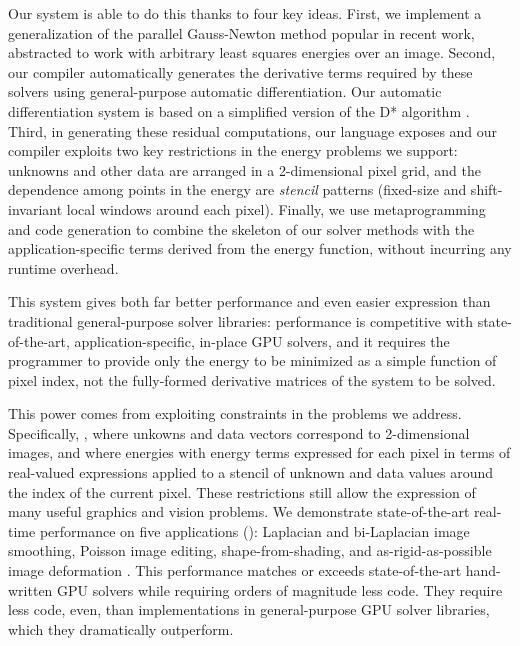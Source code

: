 Our system is able to do this thanks to four key ideas.
First, we implement a generalization of the parallel Gauss-Newton method popular in recent work, abstracted to work with arbitrary least squares energies over an image.
Second, our compiler automatically generates the derivative terms required by these solvers using general-purpose automatic  differentiation.
Our automatic differentiation system is based on a simplified version of the D* algorithm \cite{dstar}.
Third, in generating these residual computations, our language exposes and our compiler exploits two key restrictions in the energy problems we support: unknowns and other data are arranged in a 2-dimensional pixel grid, and the dependence among points in the energy are \emph{stencil} patterns (fixed-size and shift-invariant local windows around each pixel).
Finally, we use metaprogramming and code generation to combine the skeleton of our solver methods with the application-specific terms derived from the energy function, without incurring any runtime overhead.

This system gives both far better performance and even easier expression than traditional general-purpose solver libraries: performance is competitive with state-of-the-art, application-specific, in-place GPU solvers, and it requires the programmer to provide only the energy to be minimized as a simple function of pixel index, not the fully-formed derivative matrices of the system to be solved.

This power comes from exploiting constraints in the problems we address.
Specifically, , where unkowns and data vectors correspond to 2-dimensional images, and where energies  with energy terms expressed for each pixel in terms of real-valued expressions applied to a stencil of unknown and data values around the index of the current pixel.
These restrictions still allow the expression of many useful graphics and vision problems.
We demonstrate state-of-the-art real-time performance on five applications (): Laplacian and bi-Laplacian image smoothing, Poisson image editing, shape-from-shading, and as-rigid-as-possible image deformation .
This performance matches or exceeds state-of-the-art hand-written GPU solvers while requiring orders of magnitude less code.
They require less code, even, than implementations in general-purpose GPU solver libraries, which they dramatically outperform.